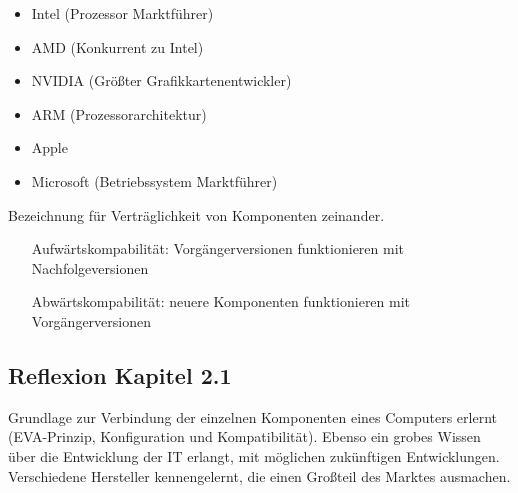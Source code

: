     \begin{itemize}[leftmargin=2.5cm]
        \item Intel (Prozessor Marktführer)
        \item AMD (Konkurrent zu Intel)
        \item NVIDIA (Größter Grafikkartenentwickler)
        \item ARM (Prozessorarchitektur)
        \item Apple
        \item Microsoft (Betriebssystem Marktführer)
    \end{itemize}
    \vspace{0.5em}
    
    \begin{tcolorbox}[width=15cm, center, title=Kompatibilität, coltitle=white, colframe=white!20!blue, colback=white!80!blue]
        Bezeichnung für Verträglichkeit von Komponenten zeinander.
        \begin{itemize}[labelsep=1em, align=parleft, leftmargin=*, widest=Abwärtskompabilität, itemsep=0em]
            \item[Aufwärtskompabilität:] Vorgängerversionen funktionieren mit Nachfolgeversionen
            \item[Abwärtskompabilität: ] neuere Komponenten funktionieren mit Vorgängerversionen
        \end{itemize}
    \end{tcolorbox}

\subsection*{Reflexion Kapitel 2.1}
    \begin{refindent}
        Grundlage zur Verbindung der einzelnen Komponenten eines Computers erlernt (EVA-Prinzip, Konfiguration und Kompatibilität).
        Ebenso ein grobes Wissen über die Entwicklung der IT erlangt, mit möglichen zukünftigen Entwicklungen.
        Verschiedene Hersteller kennengelernt, die einen Großteil des Marktes ausmachen.
    \end{refindent}
